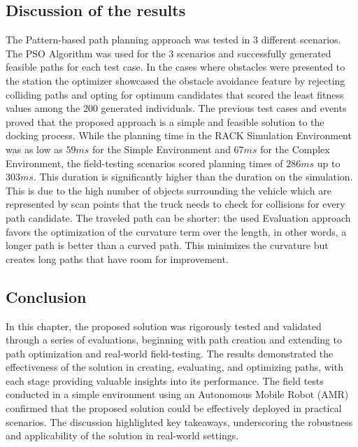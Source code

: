 \subsection{Discussion of the results}

The Pattern-based path planning approach was tested in 3 different scenarios.
The PSO Algorithm was used for the 3 scenarios and successfully generated feasible paths for each 
test case. In the cases where obstacles were presented to the station the optimizer 
showcased the obstacle avoidance feature by rejecting colliding paths and opting for optimum
candidates that scored the least fitness values among the 200 generated individuals.
The previous test cases and events proved that the proposed approach is a simple and feasible 
solution to the docking process.
While the planning time in the RACK Simulation Environment was as low as \(59ms\) for the Simple Environment
and \(67ms\) for the Complex Environment, the field-testing scenarios scored planning times of 
\(286ms\) up to \(303ms\). 
This duration is significantly higher than the duration 
on the simulation. This is due to the high number of objects surrounding the vehicle which are 
represented by scan points that the truck needs to check for collisions for every path candidate.  
The traveled path can be shorter: the used Evaluation approach favors the optimization of the 
curvature term over the length, in other words, a longer path is better than a curved path.
This minimizes the curvature but creates long paths that have room for improvement. 

\subsection*{Conclusion}
In this chapter, the proposed solution was rigorously tested and validated through a series of evaluations, 
beginning with path creation and extending to path optimization and real-world field-testing. 
The results demonstrated the effectiveness of the solution in creating, evaluating, and optimizing paths, 
with each stage providing valuable insights into its performance. The field tests conducted in a simple 
environment using an Autonomous Mobile Robot (AMR) confirmed that the proposed solution could be effectively 
deployed in practical scenarios. The discussion highlighted key takeaways, underscoring the robustness 
and applicability of the solution in real-world settings.